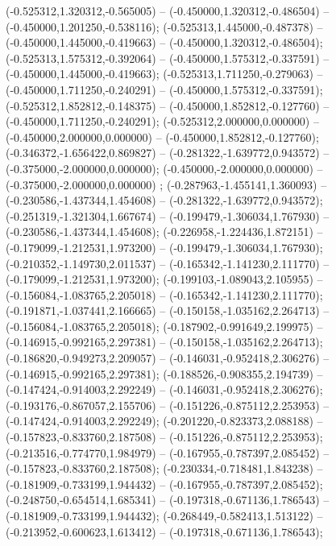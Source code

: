  (-0.525312,1.320312,-0.565005) -- (-0.450000,1.320312,-0.486504) -- (-0.450000,1.201250,-0.538116);
 (-0.525313,1.445000,-0.487378) -- (-0.450000,1.445000,-0.419663) -- (-0.450000,1.320312,-0.486504);
 (-0.525313,1.575312,-0.392064) -- (-0.450000,1.575312,-0.337591) -- (-0.450000,1.445000,-0.419663);
 (-0.525313,1.711250,-0.279063) -- (-0.450000,1.711250,-0.240291) -- (-0.450000,1.575312,-0.337591);
 (-0.525312,1.852812,-0.148375) -- (-0.450000,1.852812,-0.127760) -- (-0.450000,1.711250,-0.240291);
 (-0.525312,2.000000,0.000000) -- (-0.450000,2.000000,0.000000) -- (-0.450000,1.852812,-0.127760);
 (-0.346372,-1.656422,0.869827) -- (-0.281322,-1.639772,0.943572) -- (-0.375000,-2.000000,0.000000);
 (-0.450000,-2.000000,0.000000) -- (-0.375000,-2.000000,0.000000) ;
 (-0.287963,-1.455141,1.360093) -- (-0.230586,-1.437344,1.454608) -- (-0.281322,-1.639772,0.943572);
 (-0.251319,-1.321304,1.667674) -- (-0.199479,-1.306034,1.767930) -- (-0.230586,-1.437344,1.454608);
 (-0.226958,-1.224436,1.872151) -- (-0.179099,-1.212531,1.973200) -- (-0.199479,-1.306034,1.767930);
 (-0.210352,-1.149730,2.011537) -- (-0.165342,-1.141230,2.111770) -- (-0.179099,-1.212531,1.973200);
 (-0.199103,-1.089043,2.105955) -- (-0.156084,-1.083765,2.205018) -- (-0.165342,-1.141230,2.111770);
 (-0.191871,-1.037441,2.166665) -- (-0.150158,-1.035162,2.264713) -- (-0.156084,-1.083765,2.205018);
 (-0.187902,-0.991649,2.199975) -- (-0.146915,-0.992165,2.297381) -- (-0.150158,-1.035162,2.264713);
 (-0.186820,-0.949273,2.209057) -- (-0.146031,-0.952418,2.306276) -- (-0.146915,-0.992165,2.297381);
 (-0.188526,-0.908355,2.194739) -- (-0.147424,-0.914003,2.292249) -- (-0.146031,-0.952418,2.306276);
 (-0.193176,-0.867057,2.155706) -- (-0.151226,-0.875112,2.253953) -- (-0.147424,-0.914003,2.292249);
 (-0.201220,-0.823373,2.088188) -- (-0.157823,-0.833760,2.187508) -- (-0.151226,-0.875112,2.253953);
 (-0.213516,-0.774770,1.984979) -- (-0.167955,-0.787397,2.085452) -- (-0.157823,-0.833760,2.187508);
 (-0.230334,-0.718481,1.843238) -- (-0.181909,-0.733199,1.944432) -- (-0.167955,-0.787397,2.085452);
 (-0.248750,-0.654514,1.685341) -- (-0.197318,-0.671136,1.786543) -- (-0.181909,-0.733199,1.944432);
 (-0.268449,-0.582413,1.513122) -- (-0.213952,-0.600623,1.613412) -- (-0.197318,-0.671136,1.786543);
